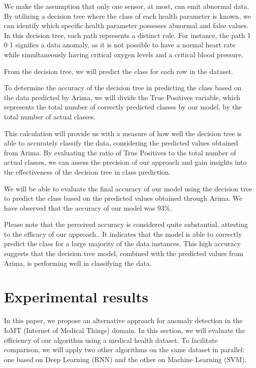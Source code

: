 \documentclass[conference]{IEEEtran}
\begin{document}
We make the assumption that only one sensor, at most, can emit abnormal data. By utilizing a decision tree where the class of each health parameter is known, we can identify which specific health parameter possesses abnormal and false values. In this decision tree, each path represents a distinct rule. For instance, the path 1 0 1 signifies a data anomaly, as it is not possible to have a normal heart rate while simultaneously having critical oxygen levels and a critical blood pressure.

From the decision tree, we will predict the class for each row in the dataset.

To determine the accuracy of the decision tree in predicting the class based on the data predicted by Arima, we will divide the True Positives variable, which represents the total number of correctly predicted classes by our model, by the total number of actual classes.

This calculation will provide us with a measure of how well the decision tree is able to accurately classify the data, considering the predicted values obtained from Arima. By evaluating the ratio of True Positives to the total number of actual classes, we can assess the precision of our approach and gain insights into the effectiveness of the decision tree in class prediction.

 We will be able to evaluate the final accuracy of our model using the decision tree to predict the class based on the predicted values obtained through Arima. We have observed that the accuracy of our model was 93\%.

Please note that the perceived accuracy is considered quite substantial, attesting to the efficacy of our approach.. It indicates that the model is able to correctly predict the class for a large majority of the data instances. This high accuracy suggests that the decision tree model, combined with the predicted values from Arima, is performing well in classifying the data.



\section{Experimental results}
In this paper, we propose an alternative approach for anomaly detection in the IoMT (Internet of Medical Things) domain. In this section, we will evaluate the efficiency of our algorithm using a medical health dataset. To facilitate comparison, we will apply two other algorithms on the same dataset in parallel: one based on Deep Learning (RNN) and the other on Machine Learning (SVM).
\end{document}
